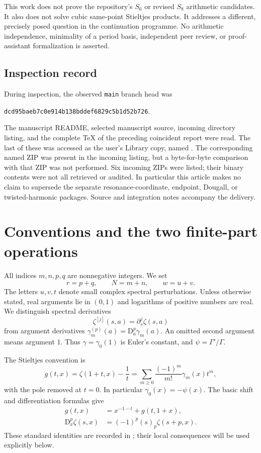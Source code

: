 \documentclass[11pt,a4paper]{article}
\numberwithin{equation}{section}
\theoremstyle{definition}
\newcommand{\D}{\mathrm D}
\newcommand{\src}[1]{\texttt{\detokenize{#1}}}
\newcommand{\pin}{\texttt{dcd95baeb7c0e914b138bddef6829c5b1d52b726}}
\begin{document}
This work does not prove the repository's $S_6$ or revised $S_8$ arithmetic candidates. It also does not solve cubic same-point Stieltjes products. It addresses a different, precisely posed question in the continuation programme. No arithmetic independence, minimality of a period basis, independent peer review, or proof-assistant formalization is asserted.

\subsection{Inspection record}
During inspection, the observed \texttt{main} branch head was
\begin{center}\small\pin.\end{center}
The manuscript README, selected manuscript source, incoming directory listing, and the complete TeX of the preceding coincident report were read. The last of these was accessed as the user's Library copy, named \src{Coincident_Point_Stieltjes_Calculus.tex}. The corresponding named ZIP was present in the incoming listing, but a byte-for-byte comparison with that ZIP was not performed. Six incoming ZIPs were listed; their binary contents were not all retrieved or audited. In particular this article makes no claim to supersede the separate resonance-coordinate, endpoint, Dougall, or twisted-harmonic packages. Source and integration notes accompany the delivery.

\section{Conventions and the two finite-part operations}\label{pc:conventions}
All indices $m,n,p,q$ are nonnegative integers. We set
\[
r=p+q,\qquad N=m+n,\qquad w=u+v.
\]
The letters $u,v,t$ denote small complex spectral perturbations. Unless otherwise stated, real arguments lie in $(0,1)$ and logarithms of positive numbers are real. We distinguish spectral derivatives
\[
\zeta^{[j]}(s,a)=\partial_s^j\zeta(s,a)
\]
from argument derivatives $\gamma_m^{(p)}(a)=\D_a^p\gamma_m(a)$. An omitted second argument means argument $1$. Thus $\gamma=\gamma_0(1)$ is Euler's constant, and $\psi=\Gamma'/\Gamma$.

The Stieltjes convention is
\begin{equation}\label{pc:g}
g(t,x)=\zeta(1+t,x)-\frac1t
=\sum_{m\ge0}\frac{(-1)^m}{m!}\gamma_m(x)t^m,
\end{equation}
with the pole removed at $t=0$. In particular $\gamma_0(x)=-\psi(x)$. The basic shift and differentiation formulas give
\begin{align}
g(t,x)&=x^{-1-t}+g(t,1+x),\label{pc:shift}\\
\D_x^p\zeta(s,x)&=(-1)^p(s)_p\zeta(s+p,x).\label{pc:hurwitz-derivative}
\end{align}
These standard identities are recorded in \cite{pc:hurwitz}; their local consequences will be used explicitly below.
\end{document}
